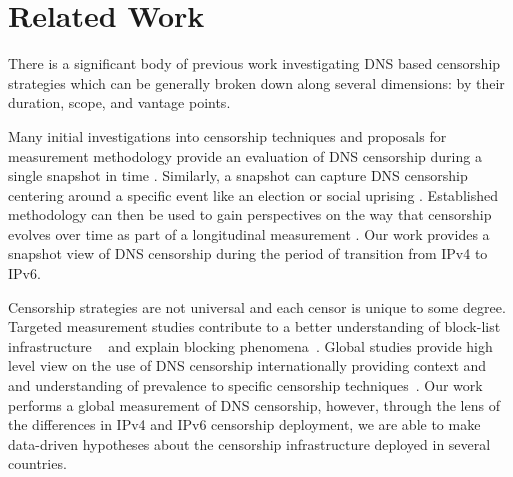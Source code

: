 \section{Related Work}\label{sec:v4vsv6-related}
% 
There is a significant body of previous work investigating DNS based censorship
strategies which can be generally broken down along several dimensions: by their
duration, scope, and vantage points.

Many initial investigations into censorship techniques and
proposals for measurement methodology provide an evaluation of DNS censorship
during a single snapshot in time \cite{Anonymous2020:TripletCensors,
global2002great, vandersloot2018quack, scott2016satellite, pearce2017global}. 
Similarly, a snapshot can capture DNS censorship centering around a specific
event like an election or social uprising \cite{aryan2013internet}.  Established
methodology can then be used to gain perspectives on the way that censorship
evolves over time as part of  a longitudinal measurement
\cite{USESEC21:GFWatch, filasto2012ooni, sundara2020censored, niaki2020iclab,
razaghpanah2016exploring}. Our work provides a snapshot view of DNS censorship
during the period of transition from IPv4 to IPv6.

Censorship strategies are not universal and each censor is unique to some
degree. Targeted measurement studies contribute to a better understanding of
block-list infrastructure ~\cite{ramesh2020decentralized, USESEC21:GFWatch} and
explain blocking phenomena~\cite{global2002great,
Anonymous2020:TripletCensors}. Global studies provide high level view on the
use of DNS censorship internationally providing context and and understanding
of prevalence to specific censorship techniques~\cite{vandersloot2018quack,
scott2016satellite, pearce2017global, sundara2020censored, niaki2020iclab}.
Our work performs a global measurement of DNS censorship, however, through the
lens of the differences in IPv4 and IPv6 censorship deployment, we are able to
make data-driven hypotheses about the censorship infrastructure deployed in
several countries.

